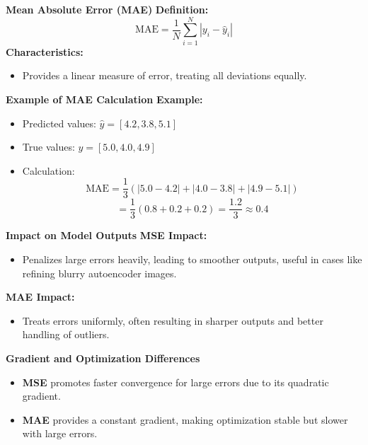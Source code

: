 \documentclass[serif, aspectratio=169]{beamer}
\begin{document}
\begin{frame}{\textbf{Mean Absolute Error (MAE)}}
    \textbf{Definition:}
    \[
    \text{MAE} = \frac{1}{N} \sum_{i=1}^{N} \left| y_i - \hat{y}_i \right|
    \]
    \textbf{Characteristics:}
    \begin{itemize}
        \item Provides a linear measure of error, treating all deviations equally.
    \end{itemize}
\end{frame}

\begin{frame}{\textbf{Example of MAE Calculation}}
    \textbf{Example:}
    \begin{itemize}
        \item Predicted values: \( \hat{y} = [4.2, 3.8, 5.1] \)
        \item True values: \( y = [5.0, 4.0, 4.9] \)
        \item Calculation:
        \[
        \text{MAE} = \frac{1}{3} \left( |5.0 - 4.2| + |4.0 - 3.8| + |4.9 - 5.1| \right)
        \]
        \[
        = \frac{1}{3} (0.8 + 0.2 + 0.2) = \frac{1.2}{3} \approx 0.4
        \]
    \end{itemize}
\end{frame}

\begin{frame}{\textbf{Impact on Model Outputs}}
    \textbf{MSE Impact:}
    \begin{itemize}
        \item Penalizes large errors heavily, leading to smoother outputs, useful in cases like refining blurry autoencoder images.
    \end{itemize}
    
    \textbf{MAE Impact:}
    \begin{itemize}
        \item Treats errors uniformly, often resulting in sharper outputs and better handling of outliers.
    \end{itemize}
\end{frame}

\begin{frame}{\textbf{Gradient and Optimization Differences}}
    \begin{itemize}
        \item \textbf{MSE} promotes faster convergence for large errors due to its quadratic gradient.
        \item \textbf{MAE} provides a constant gradient, making optimization stable but slower with large errors.
    \end{itemize}
\end{frame}
\end{document}

